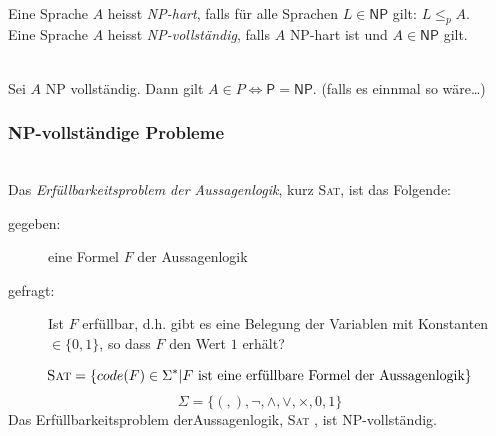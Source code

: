 \documentclass{scrartcl}
\begin{document}
\begin{shaded}
\ \\
    Eine Sprache $A$ heisst \emph{\textsf{NP}-hart}, falls für alle Sprachen $L\in\mathsf{NP}$ gilt: $L\leq_p A$. \\[.5cm]
    Eine Sprache $A$ heisst \emph{\textsf{NP}-vollständig}, falls $A$ \textsf{NP}-hart ist und $A\in\mathsf{NP}$ gilt.
\end{shaded}

\begin{shaded}
    \ \\Sei $A$ \textsf{NP} vollständig. Dann gilt $A\in P \Leftrightarrow \mathsf{P} = \mathsf{NP}$. {\tiny (falls es einnmal so wäre\dots)}
\end{shaded}

\begin{center}
\scalebox{.75}{}
\end{center}

\subsubsection*{\textsf{NP}-vollständige Probleme}
\begin{shaded}
    \ \\Das \emph{Erfüllbarkeitsproblem der Aussagenlogik}, kurz \textsc{Sat}, ist das Folgende:
    \begin{description}
        \item[gegeben:] eine Formel $F$ der Aussagenlogik
        \item[gefragt:] Ist $F$ erfüllbar, d.h. gibt es eine Belegung der Variablen mit Konstanten $\in\{0,1\}$, so dass $F$ den Wert $1$ erhält?
    \end{description}
    \[\textsc{Sat}=\{code(F)\in\Sigma^* | F \textrm{ ist eine erfüllbare Formel der Aussagenlogik} \}\]
    \[\Sigma=\{(,),\neg, \wedge,\vee,\times,0,1 \} \]
    Das Erfüllbarkeitsproblem derAussagenlogik, \textsc{Sat} , ist \textsf{NP}-vollständig.

\end{shaded}

\begin{center}
\scalebox{.75}{}
\end{center}
\end{document}
